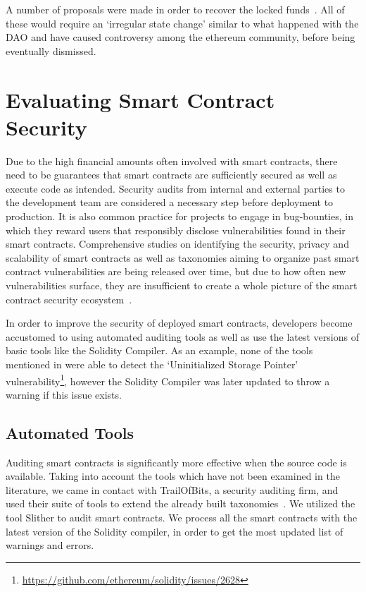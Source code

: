 A number of proposals were made in order to recover the locked funds~\cite{eip867, eip999}. All of these would require an `irregular state change' similar to what happened with the DAO and have caused controversy among the ethereum community, before being eventually dismissed.


\section{Evaluating Smart Contract Security}
Due to the high financial amounts often involved with smart contracts, there need to be guarantees that smart contracts are sufficiently secured as well as execute code as intended. Security audits from internal and external parties to the development team are considered a necessary step before deployment to production. It is also common practice for projects to engage in bug-bounties, in which they reward users that responsibly disclose vulnerabilities found in their smart contracts. Comprehensive studies on identifying the security, privacy and scalability of smart contracts as well as taxonomies aiming to organize past smart contract vulnerabilities are being released over time, but due to how often new vulnerabilities surface, they are insufficient to create a whole picture of the smart contract security ecosystem~\cite{DBLP:journals/corr/abs-1710-0637, Atzei:2017:SAE:3080353.3080363,tools}.

In order to improve the security of deployed smart contracts, developers become accustomed to using automated auditing tools as well as use the latest versions of basic tools like the Solidity Compiler. As an example, none of the tools mentioned in \cite{tools} were able to detect the `Uninitialized Storage Pointer' vulnerability\footnote{\url{https://github.com/ethereum/solidity/issues/2628}}, however the Solidity Compiler was later updated to throw a warning if this issue exists. 

\subsection{Automated Tools}\label{slither}

Auditing smart contracts is significantly more effective when the source code is available. Taking into account the tools which have not been examined in the literature, we came in contact with TrailOfBits, a security auditing firm, and used their suite of tools to extend the already built taxonomies~\cite{trailofbits}. We utilized the tool Slither to audit smart contracts. We process all the smart contracts with the latest version of the Solidity compiler, in order to get the most updated list of warnings and errors. 

